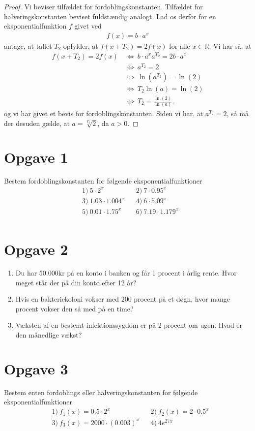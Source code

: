 \begin{proof}
Vi beviser tilfældet for fordoblingskonstanten. Tilfældet for halveringskonstanten beviset fuldstændig analogt. Lad os derfor for en eksponentialfunktion $f$ givet ved
\begin{align*}
f(x) = b\cdot a^x
\end{align*}
antage, at tallet $T_2$ opfylder, at $f(x+T_2) = 2f(x)$ for alle $x\in \mathbb{R}$. Vi har så, at 
\begin{align*}
f(x+T_2) = 2f(x) \ &\Leftrightarrow \ b\cdot a^{x}a^{T_2}=2b\cdot a^x\\
&\Leftrightarrow\ a^{T_2} = 2\\
&\Leftrightarrow\ \ln(a^{T_2}) = \ln(2)\\
&\Leftrightarrow\ T_2\ln(a) = \ln(2)\\
&\Leftrightarrow\ T_2 = \frac{\ln(2)}{\ln(a)},
\end{align*}
og vi har givet et bevis for fordoblingskonstanten. Siden vi har, at $a^{T_2} = 2$, så må der desuden gælde, at $a=\sqrt[T_2]{2}$, da $a>0$. 
\end{proof}
\section*{Opgave 1}
Bestem fordoblingskonstanten for følgende eksponentialfunktioner
\begin{align*}
	&1) \ 5\cdot 2^x   &&2) \ 7\cdot 0.95^x   \\
	&3) \ 1.03\cdot 1.004^x   &&4) \ 6\cdot 5.09^x   \\
	&5) \ 0.01\cdot 1.75^x   &&6) \ 7.19\cdot 1.179^x   \\		
\end{align*}

\section*{Opgave 2}
\begin{enumerate}[label=\roman*)]
\item Du har 50.000kr på en konto i banken og får 1 procent i årlig rente. Hvor meget står der på din konto efter 12 år?
\item Hvis en bakteriekoloni vokser med 200 procent på et døgn, hvor mange procent vokser den så med på en time?
\item Væksten af en bestemt infektionssygdom er på 2 procent om ugen. Hvad er den månedlige vækst?
\end{enumerate}
\section*{Opgave 3}
Bestem enten fordoblings eller halveringskonstanten for følgende eksponentialfunktioner
\begin{align*}
&1) \ f_1(x) = 0.5\cdot 2^x   &&2) \ f_2(x)=2\cdot 0.5^x  \\
&3) \ f_3(x) = 2000\cdot(0.003)^x  &&4) \ 4e^{27x}  \\
\end{align*}
